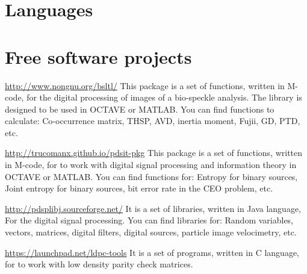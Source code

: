 \documentclass[11pt,a4paper,sans]{moderncv} %
\begin{document}

\section{Languages}


 
\section{Free software projects}

			{\url{http://www.nongnu.org/bsltl/}}
			{}{}
			{This package is a set of functions, written in M-code, 
			for the digital processing of images  of a bio-speckle analysis.
			The library is designed to be used in OCTAVE or MATLAB.
			You can find functions to calculate:
			Co-occurrence matrix, THSP, AVD, inertia moment,
			Fujii, GD, PTD, etc.}

			{\url{http://trucomanx.github.io/pdsit-pkg}}
			{}{}
			{This package is a set of functions, written in M-code, for to work
			with digital signal processing and information theory
			in OCTAVE or MATLAB. You can find functions for:
			Entropy for binary sources, Joint entropy for binary sources,
			bit error rate in the CEO problem, etc. }
			
			{\url{http://pdsplibj.sourceforge.net/}}
			{}{}
			{It is a set of libraries, written in Java language, For
			the digital signal processing. You can find
			libraries for: Random variables,
			vectors, matrices, digital filters,
			digital sources, particle image velocimetry, etc.}

			{\url{https://launchpad.net/ldpc-tools}}
			{}{}
			{It is a set of programs, written in C language, for
			to work with low density parity check matrices.}
			
\end{document}
